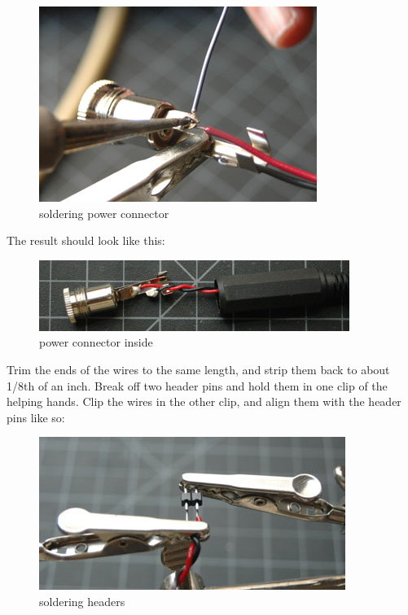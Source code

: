 \begin{figure}[!htb]
     \centering
     \includegraphics[scale=0.8]{img/soldering/soldering_power_connector.jpg}
     \caption{soldering power connector}
     \label{soldering power connector}
\end{figure}

The result should look like this:

\begin{figure}[!htb]
     \centering
     \includegraphics[scale=2.5]{img/soldering/power_conn_inside.jpg}
     \caption{power connector inside}
     \label{power connector inside}
\end{figure}


Trim the ends of the wires to the same length, and strip them back to about 1/8th of an inch. Break off two header pins and hold them in one clip of the helping hands. Clip the wires in the other clip, and align them with the header pins like so:

\begin{figure}[!htb]
     \centering
     \includegraphics[scale=2.5]{img/soldering/soldering_headers.jpg}
     \caption{soldering headers}
     \label{LEDs}
\end{figure}


